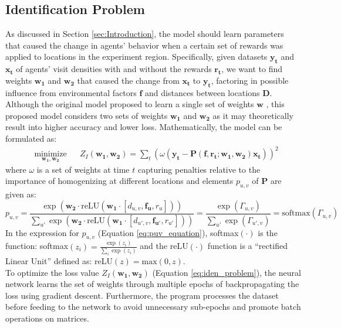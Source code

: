 \documentclass[12pt]{article}
\newcommand{\vect}[1]{\mathbf{#1}}  %
\newcommand{\matr}[1]{\mathbf{#1}}  %
\begin{document}
    \subsection{Identification Problem} \label{sec:Identification Problem}
    As discussed in Section \ref{sec:Introduction}, the model should learn parameters that caused the change in agents' behavior when a certain set of rewards was applied to locations in the experiment region. Specifically, given datasets $\vect{y_t}$ and $\vect{x_t}$ of agents' visit densities with and without the rewards $\vect{r_t}$, we want to find weights $\matr{w_1}$ and $\matr{w_2}$ that caused the change from $\vect{x_t}$ to $\vect{y_t}$, factoring in possible influence from environmental factors $\matr{f}$ and distances between locations $\matr{D}$. Although the original model proposed to learn a single set of weights $\matr{w}$ \cite{Xue2016Avi2}, this proposed model considers two sets of weights $\matr{w_1}$ and $\matr{w_2}$ as it may theoretically result into higher accuracy and lower loss. Mathematically, the model can be formulated as:
    \begin{equation} \label{eq:iden_problem}
    \begin{aligned}
    & \underset{\matr{w_1}, \matr{w_2}}{\text{minimize}}
    & & Z_I(\matr{w_1}, \matr{w_2}) = \sum_{t} (\omega(\vect{y_t} - \matr{P}(\matr{f}, \vect{r_t}; \matr{w_1}, \matr{w_2})\vect{x_t}))^{2}
    \end{aligned}
    \end{equation}
    where $\omega$ is a set of weights at time $t$ capturing penalties relative to the importance of homogenizing at different locations and elements $p_{u, v}$ of $\matr{P}$ are given as:
    \begin{equation} \label{eq:puv_equation}
    p_{u, v} = \frac{\exp(\matr{w_2} \cdot \text{reLU} (\matr{w_1} \cdot [d_{u, v}, \vect{f_{u}}, r_{u}]))}{\sum_{u'} \exp(\matr{w_2} \cdot \text{reLU} (\matr{w_1} \cdot [d_{u', v}, \vect{f_{u'}}, r_{u'}]))} = \frac{\exp(\Gamma_{u, v})}{\sum_{u'}\exp(\Gamma_{u', v})} = \text{softmax}(\Gamma_{u, v})
    \end{equation}
    In the expression for $p_{u,v}$ (Equation \ref{eq:puv_equation}), softmax$(\cdot)$ is the function: softmax$(z_i) = \frac{\exp(z_i)}{\sum_{i}\exp(z_i)}$ and the reLU$(\cdot)$ function is a ``rectified Linear Unit'' defined as: reLU$(z) = \text{max}(0, z)$.\\
    To optimize the loss value $Z_I(\matr{w_1}, \matr{w_2})$ (Equation \ref{eq:iden_problem}), the neural network learns the set of weights through multiple epochs of backpropagating the loss using gradient descent. Furthermore, the program processes the dataset before feeding to the network to avoid unnecessary sub-epochs and promote batch operations on matrices. 
    
\end{document}
